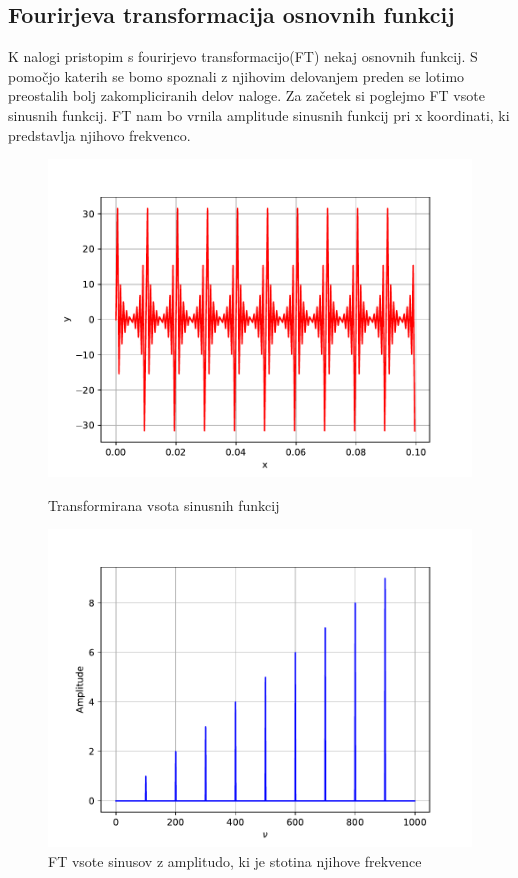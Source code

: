 \documentclass{article}
\begin{document}
\subsection{Fourirjeva transformacija osnovnih funkcij}
K nalogi pristopim s fourirjevo transformacijo(FT) nekaj osnovnih funkcij. S pomočjo katerih se bomo spoznali z njihovim delovanjem preden se lotimo preostalih bolj zakompliciranih delov naloge.
Za začetek si poglejmo FT vsote sinusnih funkcij. FT nam bo vrnila amplitude sinusnih funkcij pri x koordinati, ki predstavlja njihovo frekvenco. 
\begin{figure}[H]
    \centering
    \begin{minipage}{0.48\textwidth}
        \centering
        \includegraphics[width=\textwidth]{sinefunc.pdf}
        \caption{Transformirana vsota sinusnih funkcij}
    \end{minipage}
    \hfill
    \begin{minipage}{0.48\textwidth}
        \centering
        \includegraphics[width=\textwidth]{sines.pdf}
        \caption{FT vsote sinusov z amplitudo, ki je stotina njihove frekvence}
    \end{minipage}
\end{figure}
\end{document}
